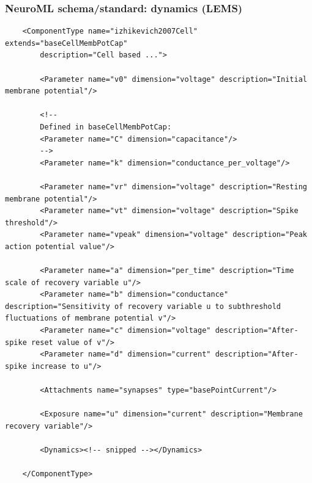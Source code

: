\begin{frame}[fragile,c]
  \frametitle{NeuroML schema/standard: dynamics (LEMS)}
  \begin{center}
    \begin{verbatim}
    <ComponentType name="izhikevich2007Cell" extends="baseCellMembPotCap"
        description="Cell based ...">

        <Parameter name="v0" dimension="voltage" description="Initial membrane potential"/>

        <!--
        Defined in baseCellMembPotCap:
        <Parameter name="C" dimension="capacitance"/>
        -->
        <Parameter name="k" dimension="conductance_per_voltage"/>

        <Parameter name="vr" dimension="voltage" description="Resting membrane potential"/>
        <Parameter name="vt" dimension="voltage" description="Spike threshold"/>
        <Parameter name="vpeak" dimension="voltage" description="Peak action potential value"/>

        <Parameter name="a" dimension="per_time" description="Time scale of recovery variable u"/>
        <Parameter name="b" dimension="conductance" description="Sensitivity of recovery variable u to subthreshold fluctuations of membrane potential v"/>
        <Parameter name="c" dimension="voltage" description="After-spike reset value of v"/>
        <Parameter name="d" dimension="current" description="After-spike increase to u"/>

        <Attachments name="synapses" type="basePointCurrent"/>

        <Exposure name="u" dimension="current" description="Membrane recovery variable"/>

        <Dynamics><!-- snipped --></Dynamics>

    </ComponentType>
    \end{verbatim}
  \end{center}
\end{frame}
